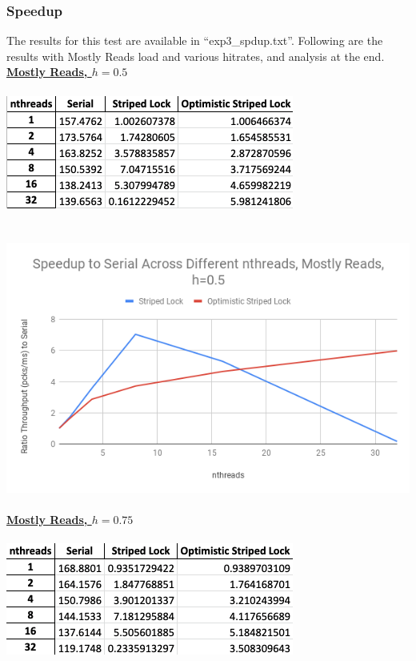 \documentclass{article}
\begin{document}
\begin{adjustwidth}{-2cm}{-2cm}
\subsubsection{Speedup}
The results for this test are available in ``exp3\_spdup.txt''. Following are the results with Mostly Reads load and various hitrates, and analysis at the end.\\
\underline{\textbf{Mostly Reads, $h=0.5$}}\\
\null\\
\includegraphics[width=\linewidth]{e3_09_5_data.png}\\ \null\\
\null\\
\includegraphics[width=\linewidth]{e3_09_5_graph.png}\\ \null\\
\underline{\textbf{Mostly Reads, $h=0.75$}}\\
\null\\
\includegraphics[width=\linewidth]{e3_09_75_data.png}\\ \null\\

\end{adjustwidth}
\end{document}
